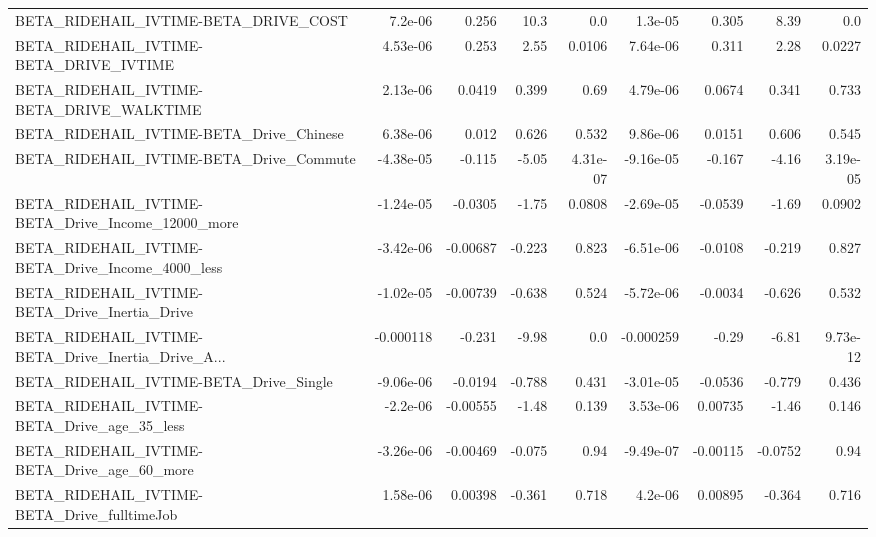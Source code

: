 \begin{tabular}{lrrrrrrrr}
BETA\_RIDEHAIL\_IVTIME-BETA\_DRIVE\_COST               &     7.2e-06 &        0.256 &     10.3 &      0.0 &    1.3e-05 &       0.305 &         8.39 &           0.0 \\
BETA\_RIDEHAIL\_IVTIME-BETA\_DRIVE\_IVTIME             &    4.53e-06 &        0.253 &     2.55 &   0.0106 &   7.64e-06 &       0.311 &         2.28 &        0.0227 \\
BETA\_RIDEHAIL\_IVTIME-BETA\_DRIVE\_WALKTIME           &    2.13e-06 &       0.0419 &    0.399 &     0.69 &   4.79e-06 &      0.0674 &        0.341 &         0.733 \\
BETA\_RIDEHAIL\_IVTIME-BETA\_Drive\_Chinese            &    6.38e-06 &        0.012 &    0.626 &    0.532 &   9.86e-06 &      0.0151 &        0.606 &         0.545 \\
BETA\_RIDEHAIL\_IVTIME-BETA\_Drive\_Commute            &   -4.38e-05 &       -0.115 &    -5.05 & 4.31e-07 &  -9.16e-05 &      -0.167 &        -4.16 &      3.19e-05 \\
BETA\_RIDEHAIL\_IVTIME-BETA\_Drive\_Income\_12000\_more  &   -1.24e-05 &      -0.0305 &    -1.75 &   0.0808 &  -2.69e-05 &     -0.0539 &        -1.69 &        0.0902 \\
BETA\_RIDEHAIL\_IVTIME-BETA\_Drive\_Income\_4000\_less   &   -3.42e-06 &     -0.00687 &   -0.223 &    0.823 &  -6.51e-06 &     -0.0108 &       -0.219 &         0.827 \\
BETA\_RIDEHAIL\_IVTIME-BETA\_Drive\_Inertia\_Drive      &   -1.02e-05 &     -0.00739 &   -0.638 &    0.524 &  -5.72e-06 &     -0.0034 &       -0.626 &         0.532 \\
BETA\_RIDEHAIL\_IVTIME-BETA\_Drive\_Inertia\_Drive\_A... &   -0.000118 &       -0.231 &    -9.98 &      0.0 &  -0.000259 &       -0.29 &        -6.81 &      9.73e-12 \\
BETA\_RIDEHAIL\_IVTIME-BETA\_Drive\_Single             &   -9.06e-06 &      -0.0194 &   -0.788 &    0.431 &  -3.01e-05 &     -0.0536 &       -0.779 &         0.436 \\
BETA\_RIDEHAIL\_IVTIME-BETA\_Drive\_age\_35\_less        &    -2.2e-06 &     -0.00555 &    -1.48 &    0.139 &   3.53e-06 &     0.00735 &        -1.46 &         0.146 \\
BETA\_RIDEHAIL\_IVTIME-BETA\_Drive\_age\_60\_more        &   -3.26e-06 &     -0.00469 &   -0.075 &     0.94 &  -9.49e-07 &    -0.00115 &      -0.0752 &          0.94 \\
BETA\_RIDEHAIL\_IVTIME-BETA\_Drive\_fulltimeJob        &    1.58e-06 &      0.00398 &   -0.361 &    0.718 &    4.2e-06 &     0.00895 &       -0.364 &         0.716 \\

\end{tabular}
